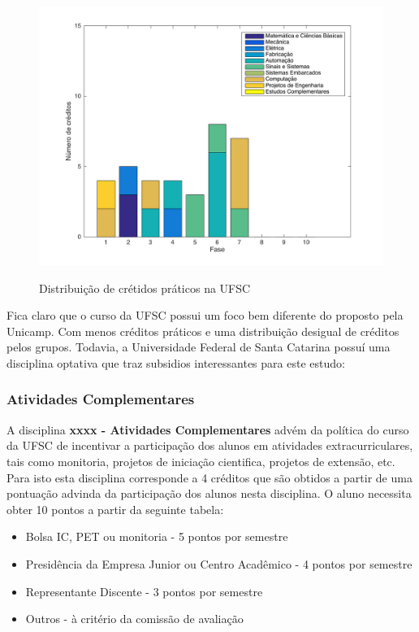 \documentclass[12pt]{article} %
\begin{document}
\begin{figure}[H]
\centering
\includegraphics[scale=0.3]{pictures/ufscDist.png}\\
\caption{Distribuição de crétidos práticos na UFSC}
\end{figure}


Fica claro que o curso da UFSC possui um foco bem diferente do proposto pela Unicamp. Com menos créditos práticos e uma distribuição desigual de créditos pelos grupos. Todavia, a Universidade Federal de Santa Catarina possuí uma disciplina optativa que traz subsidios interessantes para este estudo:

\subsubsection{Atividades Complementares}

A disciplina \textbf{ xxxx - Atividades Complementares} advém da política do curso da UFSC de incentivar a participação dos alunos em atividades extracurriculares, tais como monitoria, projetos de iniciação cientifica, projetos de extensão, etc. Para isto esta disciplina corresponde a 4 créditos que são obtidos a partir de uma pontuação advinda da participação dos alunos nesta disciplina. O aluno necessita obter 10 pontos a partir da seguinte tabela:

\begin{itemize}
\item Bolsa IC, PET ou monitoria - 5 pontos por semestre
\item Presidência da Empresa Junior ou Centro Acadêmico - 4 pontos por semestre
\item Representante Discente - 3 pontos por semestre
\item Outros - à critério da comissão de avaliação
\end{itemize}
\end{document}
